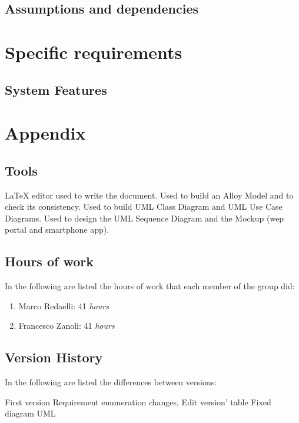 \documentclass{../Common/Structure/doc_pdf}
\begin{document}
\section{Assumptions and dependencies}


\chapter{Specific requirements}


\section{System Features}




\appendix
\chapter{Appendix}

\section{Tools}
\begin{itemize}
	 \LaTeX{} editor used to write the document.
	 Used to build an Alloy Model and to check its consistency.
	 Used to build UML Class Diagram and UML Use Case Diagrams.
	 Used to design the UML Sequence Diagram and the Mockup (wep portal and smartphone app).

\end{itemize}
\newpage
\section{Hours of work}
In the following are listed the hours of work that each member of the group did:
\begin{enumerate}
	\item Marco Redaelli: 41 \emph{hours}
	\item Francesco Zanoli: 41 \emph{hours}
\end{enumerate}
\newpage
\section{Version History}
In the following are listed the differences between versions:
\begin{enumerate}
	 First version
	 Requirement enumeration changes, Edit version' table
	 Fixed diagram UML
\end{enumerate}
\end{document}
